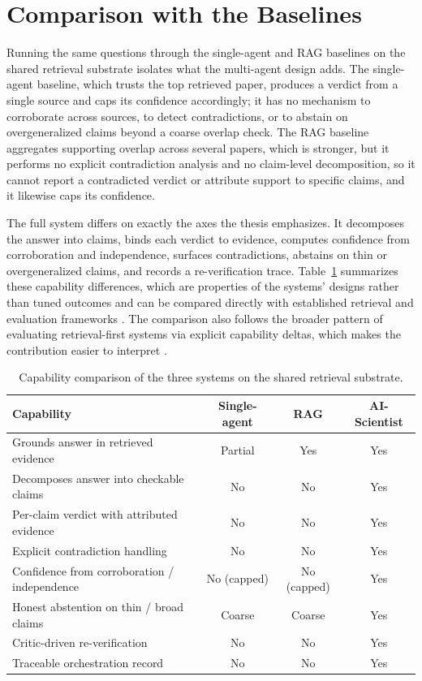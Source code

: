 \section{Comparison with the Baselines }

Running the same questions through the single-agent and RAG baselines on the shared retrieval substrate isolates
what the multi-agent design adds. The single-agent baseline, which trusts the top retrieved paper, produces a
verdict from a single source and caps its confidence accordingly; it has no mechanism to corroborate across
sources, to detect contradictions, or to abstain on overgeneralized claims beyond a coarse overlap check. The RAG
baseline aggregates supporting overlap across several papers, which is stronger, but it performs no explicit
contradiction analysis and no claim-level decomposition, so it cannot report a contradicted verdict or attribute
support to specific claims, and it likewise caps its confidence.

The full system differs on exactly the axes the thesis emphasizes. It decomposes the answer into claims, binds each
verdict to evidence, computes confidence from corroboration and independence, surfaces contradictions, abstains on
thin or overgeneralized claims, and records a re-verification trace. Table~\ref{tab:baseline-comparison} summarizes
these capability differences, which are properties of the systems' designs rather than tuned outcomes and can be
compared directly with established retrieval and evaluation frameworks \cite{petroni2020kilt,thakur2021beir,es2023ragas}.
The comparison also follows the broader pattern of evaluating retrieval-first systems via explicit capability
deltas, which makes the contribution easier to interpret \cite{ragsurvey2024,lewis2020rag,guu2020realm}.

\begin{table}[!htbp]
\centering
\small
\begin{tabularx}{0.98\textwidth}{>{\raggedright\arraybackslash}X c c c}
\toprule
Capability & Single-agent & RAG & AI-Scientist \\
\midrule
Grounds answer in retrieved evidence & Partial & Yes & Yes \\
Decomposes answer into checkable claims & No & No & Yes \\
Per-claim verdict with attributed evidence & No & No & Yes \\
Explicit contradiction handling & No & No & Yes \\
Confidence from corroboration / independence & No (capped) & No (capped) & Yes \\
Honest abstention on thin / broad claims & Coarse & Coarse & Yes \\
Critic-driven re-verification & No & No & Yes \\
Traceable orchestration record & No & No & Yes \\
\bottomrule
\end{tabularx}
\caption{Capability comparison of the three systems on the shared retrieval substrate.}
\label{tab:baseline-comparison}
\end{table}

